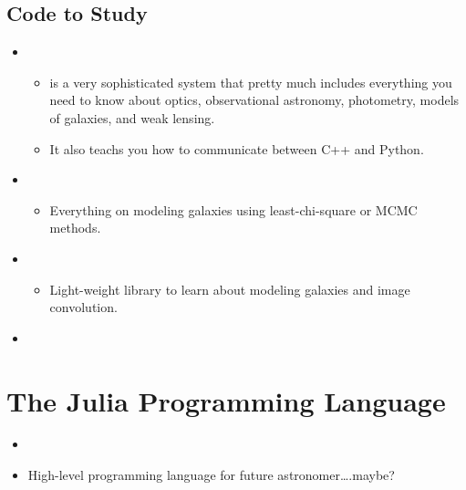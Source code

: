 \documentclass[letterpaper,10pt,english]{sphinxmanual}
\begin{document}
\subsection{Code to Study}
\label{\detokenize{resource/programing/cpp_basic:code-to-study}}\begin{itemize}
\item {} 
\begin{itemize}
\item {} 
 is a very sophisticated system that pretty much
includes everything you need to know about optics, observational
astronomy, photometry, models of galaxies, and weak lensing.

\item {} 
It also teachs you how to communicate between C++ and Python.

\end{itemize}

\item {} 
\begin{itemize}
\item {} 
Everything on modeling galaxies using least-chi-square or MCMC
methods.

\end{itemize}

\item {} 
\begin{itemize}
\item {} 
Light-weight library to learn about modeling galaxies and image
convolution.

\end{itemize}

\item {} 

\end{itemize}


\section{The Julia Programming Language}
\label{\detokenize{resource/programing/julia_basic:the-julia-programming-language}}\label{\detokenize{resource/programing/julia_basic::doc}}\begin{itemize}
\item {} 

\item {} 
High-level programming language for future astronomer….maybe?

\end{itemize}
\end{document}
